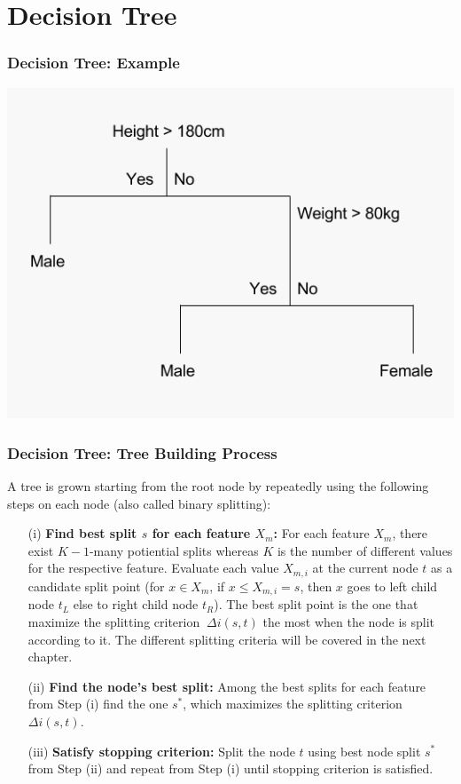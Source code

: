 \section{Decision Tree}

\begin{frame}
	\frametitle{Decision Tree: Example}
	\begin{center}		
		\includegraphics[height=0.7\textheight]{images/decision_tree_example.png}
	\end{center}
\end{frame}

\begin{frame}
	\frametitle{Decision Tree: Tree Building Process}
	A tree is grown starting from the root node by repeatedly 
	using the following steps on each node (also called binary splitting):
	\begin{enumerate}
		\item[(i)] \textbf{Find best split \(s\) for each feature \(X_{m}\):}
		For each feature \(X_{m}\), there exist \(K-1\)-many potiential splits whereas \(K\) is the number of different values for the respective feature.
		Evaluate each value \(X_{m,i}\) at the current node \(t\) as a candidate split point (for \(x \in X_{m}\), if \(x \leq X_{m,i}=s\),
		then \(x\) goes to left child node \(t_{L}\) else to right child node \(t_{R}\)).
		The best split point is the one that maximize the splitting criterion \(\ \Delta i(s,t) \) the most when the node is split according to it.
		The different splitting criteria will be covered in the next chapter.
		\item[(ii)] \textbf{Find the node’s best split:} Among the best splits for each feature from Step (i) find the one \(s^{*}\), which maximizes the splitting criterion \(\Delta i(s,t)\).
		\item[(iii)] \textbf{Satisfy stopping criterion:} Split the node \(t\) using best node split \(s^{*}\) from Step (ii) and 
		repeat from Step (i) until stopping criterion is satisfied. 
	\end{enumerate}
\end{frame}	

